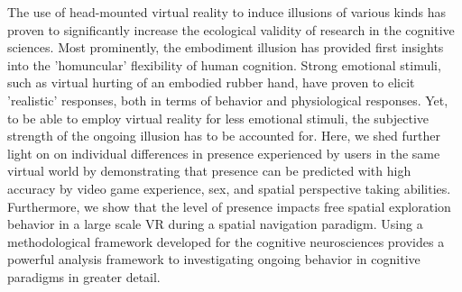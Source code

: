 The use of head-mounted virtual reality to induce illusions of various kinds has proven to significantly increase the ecological validity of research in the cognitive sciences. Most prominently, the embodiment illusion has provided first insights into the 'homuncular' flexibility of human cognition. Strong emotional stimuli, such as virtual hurting of an embodied rubber hand, have proven to elicit 'realistic' responses, both in terms of behavior and physiological responses. Yet, to be able to employ virtual reality for less emotional stimuli, the subjective strength of the ongoing illusion has to be accounted for. Here, we shed further light on on individual differences in presence experienced by users in the same virtual world by demonstrating that presence can be predicted with high accuracy by video game experience, sex, and spatial perspective taking abilities. Furthermore, we show that the level of presence impacts free spatial exploration behavior in a large scale VR during a spatial navigation paradigm. Using a methodological framework developed for the cognitive neurosciences provides a powerful analysis framework to investigating ongoing behavior in cognitive paradigms in greater detail.